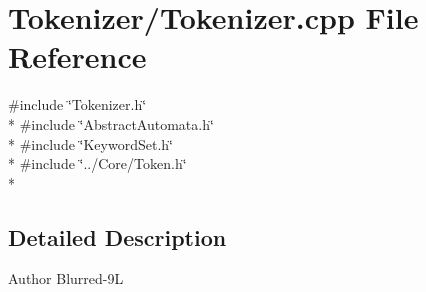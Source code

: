 \section{Tokenizer/\-Tokenizer.cpp File Reference}
\label{_tokenizer_8cpp}
{\ttfamily \#include \char`\"{}Tokenizer.\-h\char`\"{}}\\*
{\ttfamily \#include \char`\"{}Abstract\-Automata.\-h\char`\"{}}\\*
{\ttfamily \#include \char`\"{}Keyword\-Set.\-h\char`\"{}}\\*
{\ttfamily \#include \char`\"{}../\-Core/\-Token.\-h\char`\"{}}\\*


\subsection{Detailed Description}
\begin{DoxyAuthor}{Author}
Blurred-\/9\-L 
\end{DoxyAuthor}
